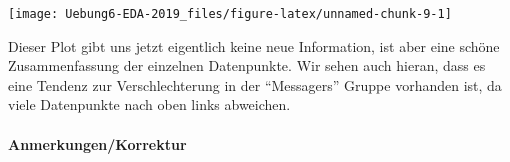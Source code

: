 \documentclass[]{article}
\let\oldparagraph\paragraph
\renewcommand{\paragraph}[1]{\oldparagraph{#1}\mbox{}}
\begin{document}
\texttt{[image: Uebung6-EDA-2019\_files/figure-latex/unnamed-chunk-9-1]}

Dieser Plot gibt uns jetzt eigentlich keine neue Information, ist aber
eine schöne Zusammenfassung der einzelnen Datenpunkte. Wir sehen auch
hieran, dass es eine Tendenz zur Verschlechterung in der ``Messagers''
Gruppe vorhanden ist, da viele Datenpunkte nach oben links abweichen.

\paragraph{Anmerkungen/Korrektur}

\textcolor{gray}{\hrulefill}
\end{document}
